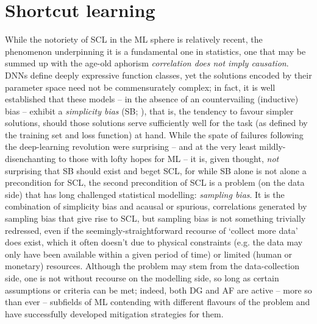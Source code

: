 \section{Shortcut learning}\label{sec:shortcut-learning}
%
%
While the notoriety of \acf{SCL} in the \ac{ML} sphere is relatively recent, the phenomenon
underpinning it is a fundamental one in statistics, one that may be summed up with the age-old
aphorism \emph{correlation does not imply causation}.
%
DNNs define deeply expressive function classes, yet the solutions encoded by their parameter space
need not be commensurately complex; in fact, it is well established that these models -- in the
absence of an countervailing (inductive) bias -- exhibit a \emph{simplicity bias} (SB;
\cite{valle2018deep}), that is, the tendency to favour simpler solutions, should those solutions
serve sufficiently well for the task (as defined by the training set and loss function) at hand.
%
While the spate of failures following the deep-learning revolution were surprising -- and at the
very least mildly-disenchanting to those with lofty hopes for \ac{ML} -- it is, given thought,
\emph{not} surprising that SB should exist and beget \ac{SCL}, for while SB alone is not alone a
precondition for \ac{SCL}, the second precondition  of \ac{SCL} is a problem (on the data side)
that has long challenged statistical modelling: \emph{sampling bias}.
%
It is the combination of simplicity bias and acausal or spurious, correlations generated by
sampling bias that give rise to \ac{SCL}, but sampling bias is not something trivially redressed, even
if the seemingly-straightforward recourse of `collect more data' does exist, which it often doesn't
due to physical constraints (e.g. the data may only have been available within a given period of
time) or limited (human or monetary) resources.
%
Although the problem may stem from the data-collection side, one is not without recourse on the
modelling side, so long as certain assumptions or criteria can be met;
%
indeed, both \ac{DG} and \ac{AF} are active -- more so than ever -- subfields of \ac{ML} contending with
different flavours of the problem and have successfully developed mitigation strategies for them.

